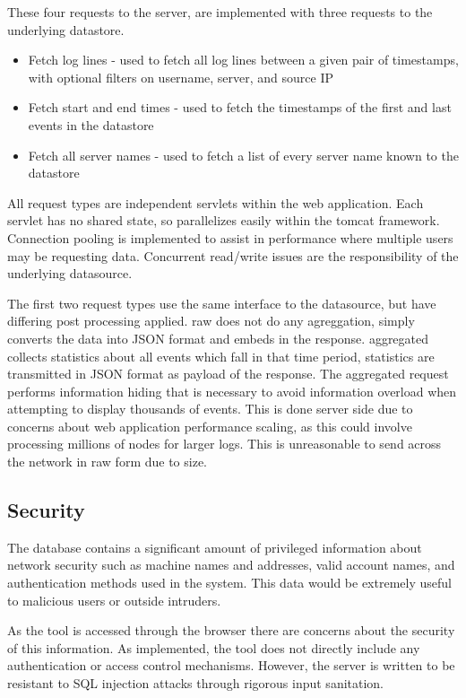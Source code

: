 These four requests to the server, are implemented with three requests to the underlying datastore.

\begin{itemize}
\item{Fetch log lines - used to fetch all log lines between a given pair of timestamps, with optional filters on username, server, and source IP}
\item{Fetch start and end times - used to fetch the timestamps of the first and last events in the datastore}
\item{Fetch all server names - used to fetch a list of every server name known to the datastore}
\end{itemize}

All request types are independent servlets within the web application. Each servlet has no shared state, so parallelizes easily within the tomcat framework. Connection pooling is implemented to assist in performance where multiple users may be requesting data. Concurrent read/write issues are the responsibility of the underlying datasource.

The first two request types use the same interface to the datasource, but have differing post processing applied. raw does not do any agreggation, simply converts the data into JSON format and embeds in the response. aggregated collects statistics about all events which fall in that time period, statistics are transmitted in JSON format as payload of the response.
The aggregated request performs information hiding that is necessary to avoid information overload when attempting to display thousands of events. This is done server side due to concerns about web application performance scaling, as this could involve processing millions of nodes for larger logs. This is unreasonable to send across the network in raw form due to size.

\subsection{Security}\label{des_sec}

The database contains a significant amount of privileged information about network security such as machine names and addresses, valid account names, and authentication methods used in the system. This data would be extremely useful to malicious users or outside intruders.

As the tool is accessed through the browser there are concerns about the security of this information. As implemented, the tool does not directly include any authentication or access control mechanisms. However, the server is written to be resistant to SQL injection attacks through rigorous input sanitation.


